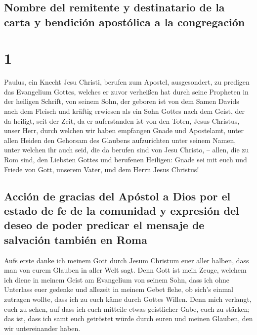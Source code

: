 \hypertarget{nombre-del-remitente-y-destinatario-de-la-carta-y-bendiciuxf3n-apostuxf3lica-a-la-congregaciuxf3n}{%
\subsection{Nombre del remitente y destinatario de la carta y bendición
apostólica a la
congregación}\label{nombre-del-remitente-y-destinatario-de-la-carta-y-bendiciuxf3n-apostuxf3lica-a-la-congregaciuxf3n}}

\hypertarget{section}{%
\section{1}\label{section}}

 Paulus, ein Knecht Jesu Christi, berufen zum Apostel,
ausgesondert, zu predigen das Evangelium Gottes,  welches
er zuvor verheißen hat durch seine Propheten in der heiligen Schrift,
 von seinem Sohn, der geboren ist von dem Samen Davids
nach dem Fleisch  und kräftig erwiesen als ein Sohn Gottes
nach dem Geist, der da heiligt, seit der Zeit, da er auferstanden ist
von den Toten, Jesus Christus, unser Herr,  durch welchen
wir haben empfangen Gnade und Apostelamt, unter allen Heiden den
Gehorsam des Glaubens aufzurichten unter seinem Namen, 
unter welchen ihr auch seid, die da berufen sind von Jesu Christo, --
 allen, die zu Rom sind, den Liebsten Gottes und berufenen
Heiligen: Gnade sei mit euch und Friede von Gott, unserem Vater, und dem
Herrn Jesus Christus!

\hypertarget{acciuxf3n-de-gracias-del-apuxf3stol-a-dios-por-el-estado-de-fe-de-la-comunidad-y-expresiuxf3n-del-deseo-de-poder-predicar-el-mensaje-de-salvaciuxf3n-tambiuxe9n-en-roma}{%
\subsection{Acción de gracias del Apóstol a Dios por el estado de fe de
la comunidad y expresión del deseo de poder predicar el mensaje de
salvación también en
Roma}\label{acciuxf3n-de-gracias-del-apuxf3stol-a-dios-por-el-estado-de-fe-de-la-comunidad-y-expresiuxf3n-del-deseo-de-poder-predicar-el-mensaje-de-salvaciuxf3n-tambiuxe9n-en-roma}}

 Aufs erste danke ich meinem Gott durch Jesum Christum
euer aller halben, dass man von eurem Glauben in aller Welt sagt.
 Denn Gott ist mein Zeuge, welchem ich diene in meinem
Geist am Evangelium von seinem Sohn, dass ich ohne Unterlass euer
gedenke  und allezeit in meinem Gebet flehe, ob sich's
einmal zutragen wollte, dass ich zu euch käme durch Gottes Willen.
 Denn mich verlangt, euch zu sehen, auf dass ich euch
mitteile etwas geistlicher Gabe, euch zu stärken;  das
ist, dass ich samt euch getröstet würde durch euren und meinen Glauben,
den wir untereinander haben.

